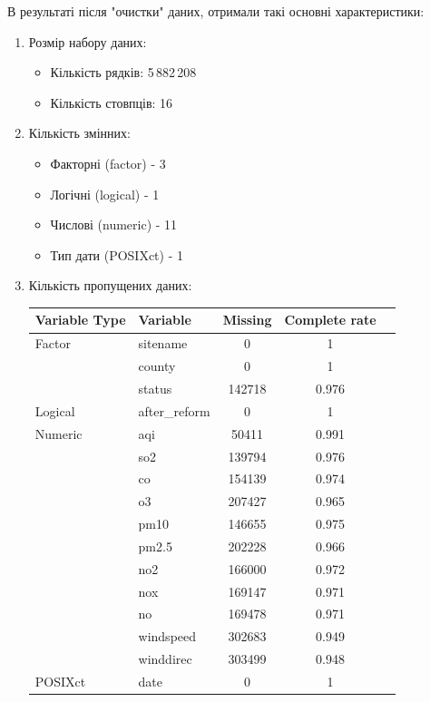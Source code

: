 \documentclass[./report.tex]{subfiles}
\begin{document}
В результаті після "очистки" даних, отримали такі основні характеристики:

\begin{enumerate}
  \item Розмір набору даних:
    \begin{itemize}
      \item Кількість рядків: 5\,882\,208
      \item Кількість стовпців: 16
    \end{itemize}
  \item Кількість змінних:
    \begin{itemize}
      \item Факторні (factor) - 3
      \item Логічні (logical) - 1
      \item Числові (numeric) - 11
      \item Тип дати (POSIXct) -  1
    \end{itemize}

  \pagebreak

  \item Кількість пропущених даних:

  \begin{table}[h!]
    \centering
    \begin{tabular}{llccc}
      \hline
      \textbf{Variable Type} & \textbf{Variable} & \textbf{Missing} & \textbf{Complete rate} \\
      \hline
      Factor   & sitename      & 0      & 1     \\
               & county        & 0      & 1     \\
               & status        & 142718 & 0.976 \\
      Logical  & after\_reform & 0      & 1     \\
      Numeric  & aqi           & 50411  & 0.991 \\
               & so2           & 139794 & 0.976 \\
               & co            & 154139 & 0.974 \\
               & o3            & 207427 & 0.965 \\
               & pm10          & 146655 & 0.975 \\
               & pm2.5         & 202228 & 0.966 \\
               & no2           & 166000 & 0.972 \\
               & nox           & 169147 & 0.971 \\
               & no            & 169478 & 0.971 \\
               & windspeed     & 302683 & 0.949 \\
               & winddirec     & 303499 & 0.948 \\
      POSIXct  & date          & 0      & 1     \\
    \end{tabular}


\end{table}
\end{enumerate}
\end{document}
